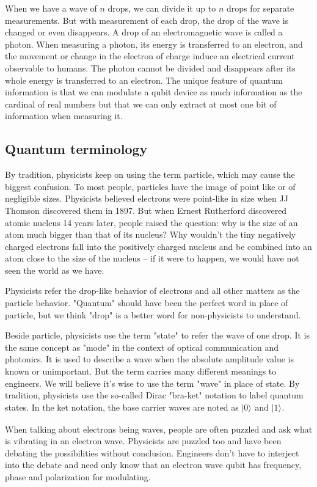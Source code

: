 \documentclass{book}
\newcommand{\keta}[2][]{\vert {#2} \rangle_{#1}}
\begin{document}
When we have a wave of $n$ drops, we can divide it up to $n$ drops for separate measurements. But with measurement of each drop, the drop of the wave is changed or even disappears. A drop of an electromagnetic wave is called a photon. When measuring a photon, its energy is transferred to an electron, and the movement or change in the electron of charge induce an electrical current observable to humans. The photon cannot be divided and disappears after its whole energy is transferred to an electron. The unique feature of quantum information is that we can modulate a qubit device as much information as the cardinal of real numbers but that we can only extract at most one bit of information when measuring it.

\subsection{Quantum terminology}
By tradition, physicists keep on using the term particle, which may cause the biggest confusion. To most people, particles have the image of point like or of negligible sizes. Physicists believed electrons were point-like in size when JJ Thomson discovered them in 1897. But when Ernest Rutherford discovered atomic nucleus 14 years later, people raised the question: why is the size of an atom much bigger than that of its nucleus? Why wouldn't the tiny negatively charged electrons fall into the positively charged nucleus and be combined into an atom close to the size of the nucleus -- if it were to happen, we would have not seen the world as we have.

Physicists refer the drop-like behavior of electrons and all other matters as the particle behavior. "Quantum" should have been the perfect word in place of particle, but we think "drop" is a better word for non-physicists to understand.

Beside particle, physicists use the term "state" to refer the wave of one drop. It is the same concept as "mode" in the context of optical communication and photonics. It is used to describe a wave when the absolute amplitude value is known or unimportant. But the term carries many different meanings to engineers. We will believe it's wise to use the term "wave" in place of state. By tradition, physicists use the so-called Dirac "bra-ket" notation to label quantum states. In the ket notation, the base carrier waves are noted as $\keta{0}$ and $\keta{1}$.

When talking about electrons being waves, people are often puzzled and ask what is vibrating in an electron wave. Physicists are puzzled too and have been debating the possibilities without conclusion. Engineers don't have to interject into the debate and need only know that an electron wave qubit has frequency, phase and polarization for modulating.
\end{document}
